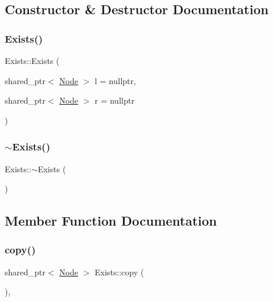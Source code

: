 \subsection{Constructor \& Destructor Documentation}
\mbox{\label{class_exists_ae51931aa14079e565a7b700b8f1d1fb1}} 
\subsubsection{\texorpdfstring{Exists()}{Exists()}}
{\footnotesize\ttfamily Exists\+::\+Exists (\begin{DoxyParamCaption}\item[{shared\+\_\+ptr$<$ \hyperlink{class_node}{Node} $>$}]{l = {\ttfamily nullptr},  }\item[{shared\+\_\+ptr$<$ \hyperlink{class_node}{Node} $>$}]{r = {\ttfamily nullptr} }\end{DoxyParamCaption})}

\mbox{\label{class_exists_a12ebe07a95afddca068d6cbdd67508f2}} 
\subsubsection{\texorpdfstring{$\sim$\+Exists()}{~Exists()}}
{\footnotesize\ttfamily Exists\+::$\sim$\+Exists (\begin{DoxyParamCaption}{ }\end{DoxyParamCaption})\hspace{0.3cm}{\ttfamily [override]}}



\subsection{Member Function Documentation}
\mbox{\label{class_exists_a135277d9bfed780d4ea493ef355055d4}} 
\subsubsection{\texorpdfstring{copy()}{copy()}}
{\footnotesize\ttfamily shared\+\_\+ptr$<$ \hyperlink{class_node}{Node} $>$ Exists\+::copy (\begin{DoxyParamCaption}{ }\end{DoxyParamCaption})\hspace{0.3cm}{\ttfamily [override]}, {\ttfamily [virtual]}}



